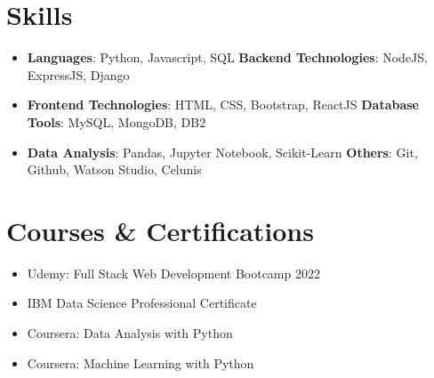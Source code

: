 \documentclass[letterpaper,11pt]{article}
\newcommand{\resumeItemSub}[1]{
  \item\small{
    {#1 \vspace{-2pt}}
  }
}
\newcommand{\resumeSubHeadingListStart}{\begin{itemize}[leftmargin=*]}
\newcommand{\resumeSubHeadingListEnd}{\end{itemize}}
\begin{document}
%
\section{Skills}
 \resumeSubHeadingListStart
    \item{
     \textbf{Languages}{: Python, Javascript, SQL}
     \hfill
     \textbf{Backend Technologies}{: NodeJS, ExpressJS, Django}
    }
    \item{
     \textbf{Frontend Technologies}{: HTML, CSS, Bootstrap, ReactJS}
     \hfill
     \textbf{Database Tools}{: MySQL, MongoDB, DB2}
    }
    \item{
     \textbf{Data Analysis}{: Pandas, Jupyter Notebook, Scikit-Learn}
     \hfill
     \textbf{Others}{: Git, Github, Watson Studio, Celunis}
    }
 \resumeSubHeadingListEnd

\section{Courses \& Certifications}
  \resumeSubHeadingListStart
    \resumeItemSub{Udemy: Full Stack Web Development Bootcamp 2022}
    \resumeItemSub{IBM Data Science Professional Certificate}
    \resumeItemSub{Coursera: Data Analysis with Python}
    \resumeItemSub{Coursera: Machine Learning with Python}
    
  \resumeSubHeadingListEnd
\end{document}

